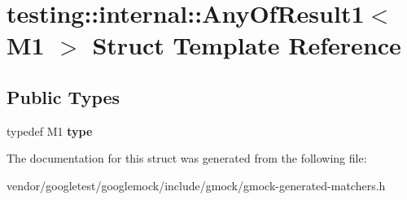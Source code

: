 \hypertarget{structtesting_1_1internal_1_1_any_of_result1}{}\section{testing\+:\+:internal\+:\+:Any\+Of\+Result1$<$ M1 $>$ Struct Template Reference}
\label{structtesting_1_1internal_1_1_any_of_result1}
\subsection*{Public Types}
\begin{DoxyCompactItemize}
\item 
\mbox{\label{structtesting_1_1internal_1_1_any_of_result1_a4c55b5cf196c93e2a822bc99625f6797}} 
typedef M1 {\bfseries type}
\end{DoxyCompactItemize}


The documentation for this struct was generated from the following file\+:\begin{DoxyCompactItemize}
\item 
vendor/googletest/googlemock/include/gmock/gmock-\/generated-\/matchers.\+h\end{DoxyCompactItemize}

